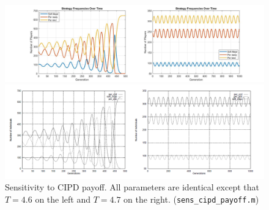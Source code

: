 \begin{figure}[ht!]
	\centering
	\begin{minipage}{1\textwidth}
		\includegraphics[width=1\linewidth]{fit_plots_theoretical/sensitivity_to_cipd_payoff}
		
		
	\end{minipage}
	\begin{minipage}{1\textwidth}
		\includegraphics[width=1\linewidth]{sens_cipd}
	\end{minipage}
	\caption{Sensitivity to CIPD payoff. All parameters are identical except that \(T=4.6\)
		on the left and \( T=4.7\) on the right. (\texttt{sens\_cipd\_payoff.m})}
\end{figure}


